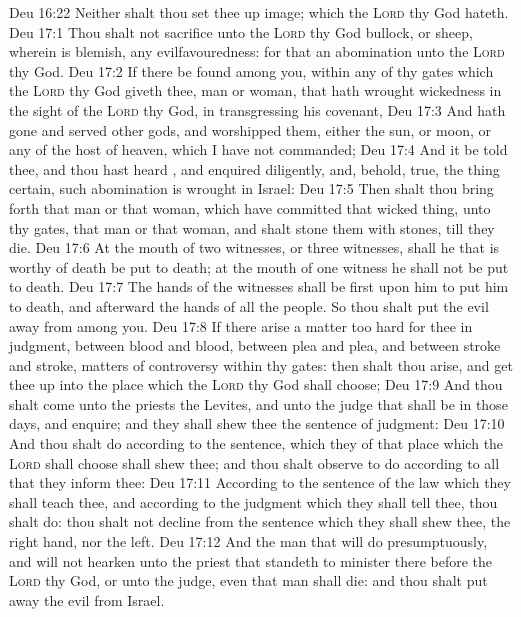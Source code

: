 \vs Deu 16:22 Neither shalt thou set thee up  image; which the \textsc{Lord} thy God hateth.
\vs Deu 17:1 Thou shalt not sacrifice unto the \textsc{Lord} thy God  bullock, or sheep, wherein is blemish,  any evilfavouredness: for that  an abomination unto the \textsc{Lord} thy God.
\vs Deu 17:2 If there be found among you, within any of thy gates which the \textsc{Lord} thy God giveth thee, man or woman, that hath wrought wickedness in the sight of the \textsc{Lord} thy God, in transgressing his covenant,
\vs Deu 17:3 And hath gone and served other gods, and worshipped them, either the sun, or moon, or any of the host of heaven, which I have not commanded;
\vs Deu 17:4 And it be told thee, and thou hast heard , and enquired diligently, and, behold,  true,  the thing certain,  such abomination is wrought in Israel:
\vs Deu 17:5 Then shalt thou bring forth that man or that woman, which have committed that wicked thing, unto thy gates,  that man or that woman, and shalt stone them with stones, till they die.
\vs Deu 17:6 At the mouth of two witnesses, or three witnesses, shall he that is worthy of death be put to death;  at the mouth of one witness he shall not be put to death.
\vs Deu 17:7 The hands of the witnesses shall be first upon him to put him to death, and afterward the hands of all the people. So thou shalt put the evil away from among you.
\vs Deu 17:8 If there arise a matter too hard for thee in judgment, between blood and blood, between plea and plea, and between stroke and stroke,  matters of controversy within thy gates: then shalt thou arise, and get thee up into the place which the \textsc{Lord} thy God shall choose;
\vs Deu 17:9 And thou shalt come unto the priests the Levites, and unto the judge that shall be in those days, and enquire; and they shall shew thee the sentence of judgment:
\vs Deu 17:10 And thou shalt do according to the sentence, which they of that place which the \textsc{Lord} shall choose shall shew thee; and thou shalt observe to do according to all that they inform thee:
\vs Deu 17:11 According to the sentence of the law which they shall teach thee, and according to the judgment which they shall tell thee, thou shalt do: thou shalt not decline from the sentence which they shall shew thee,  the right hand, nor  the left.
\vs Deu 17:12 And the man that will do presumptuously, and will not hearken unto the priest that standeth to minister there before the \textsc{Lord} thy God, or unto the judge, even that man shall die: and thou shalt put away the evil from Israel.
